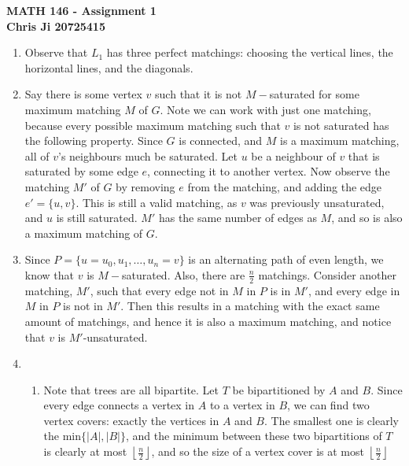 \documentclass[10pt,english]{article}
\begin{document}
\noindent \begin{center}
\textbf{\large{}MATH 146 - Assignment 1}\\
\textbf{\large{}Chris Ji 20725415}
\par\end{center}{\large \par}
\medskip{}

\begin{enumerate}
\pagebreak\item Observe that $L_1$ has three perfect matchings: choosing the vertical lines, the horizontal lines, and the diagonals. 

\pagebreak\item Say there is some vertex $v$ such that it is not $M-$saturated for some maximum matching $M$ of $G$. Note we can work with just one matching, because every possible maximum matching such that $v$ is not saturated has the following property. Since $G$ is connected, and $M$ is a maximum matching, all of $v$'s neighbours much be saturated. Let $u$ be a neighbour of $v$ that is saturated by some edge $e$, connecting it to another vertex. Now observe the matching $M'$ of $G$ by removing $e$ from the matching, and adding the edge $e'=\{u,v\}$. This is still a valid matching, as $v$ was previously unsaturated, and $u$ is still saturated. $M'$ has the same number of edges as $M$, and so is also a maximum matching of $G$. 


\pagebreak\item Since $P=\{u=u_0,u_1,\ldots,u_n=v\}$ is an alternating path of even length, we know that $v$ is $M-$saturated. Also, there are $\frac{n}{2}$ matchings. Consider another matching, $M'$, such that every edge not in $M$ in $P$ is in $M'$, and every edge in $M$ in $P$ is not in $M'$. Then this results in a matching with the exact same amount of matchings, and hence it is also a maximum matching, and notice that $v$ is $M'$-unsaturated. 


\pagebreak\item \begin{enumerate}
    \item Note that trees are all bipartite. Let $T$ be bipartitioned by $A$ and $B$. Since every edge connects a vertex in $A$ to a vertex in $B$, we can find two vertex covers: exactly the vertices in $A$ and $B$. The smallest one is clearly the $\text{min}\{|A|,|B|\}$, and the minimum between these two bipartitions of $T$ is clearly at most $\left\lfloor\frac{n}{2}\right\rfloor$, and so the size of a vertex cover is at most $\left\lfloor\frac{n}{2}\right\rfloor$
    

\end{enumerate}
\end{enumerate}
\end{document}

